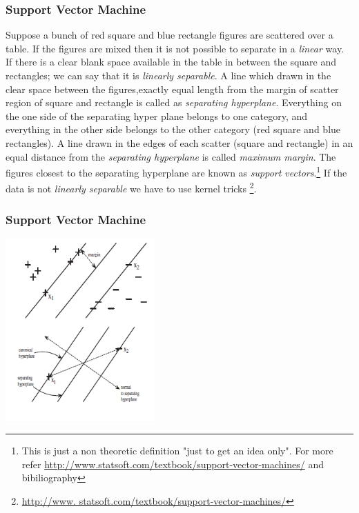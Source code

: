 \documentclass[serif,11pt,aspectratio=1610,table]{beamer}
\begin{document}
\begin{frame}[fragile]
 \frametitle{Support Vector Machine}
\footnotesize
\justifying 
Suppose a bunch of red square and blue rectangle figures are scattered over a table. If the figures are mixed then it is not possible to separate in a \emph{linear} way. \\
If there is a clear blank space available in the table in between the square and rectangles; we can say that it is \emph{linearly separable}. A line which drawn in the clear space between the figures,exactly equal length from the margin of scatter region of square and rectangle is called as \emph{separating hyperplane}. Everything on the one side of the separating hyper plane belongs to one category, and everything in the other side belongs to the other category (red square and blue rectangles). A line drawn in the edges of each scatter (square and rectangle) in an equal distance from the \emph{separating hyperplane} is called \emph{maximum margin}. The figures closest to the separating hyperplane are known as \emph{support vectors}.\footnote{This is just a non theoretic definition "just to get an idea only". For more refer \url{http://www.statsoft.com/textbook/support-vector-machines/} and bibiliography} If the data is not \emph{linearly separable} we have to use kernel tricks \footnote{\url{http://www.
statsoft.com/textbook/support-vector-machines/}}.
\end{frame}

\begin{frame}
 \frametitle{Support Vector Machine}
 \begin{center}
  \includegraphics[height=7cm]{svm.png}
 \end{center}

\end{frame}
\end{document}

